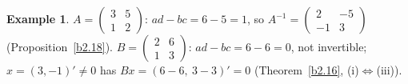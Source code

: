 \documentclass[12pt]{article}
\theoremstyle{definition}
\newtheorem{example}[theorem]{Example}
\begin{document}
\begin{example}\label{b2.19}
\(A=\left(\begin{smallmatrix}3&5\\1&2\end{smallmatrix}\right)\): \(ad-bc=6-5=1\), so
\(A^{-1}=\left(\begin{smallmatrix}2&-5\\-1&3\end{smallmatrix}\right)\) (Proposition~\ref{b2.18}).
\(B=\left(\begin{smallmatrix}2&6\\1&3\end{smallmatrix}\right)\): \(ad-bc=6-6=0\), not invertible;
\(x=(3,-1)'\ne0\) has \(Bx=(6-6,\ 3-3)'=0\) (Theorem~\ref{b2.16}, (i)\(\Leftrightarrow\)(iii)).
\end{example}
\end{document}
